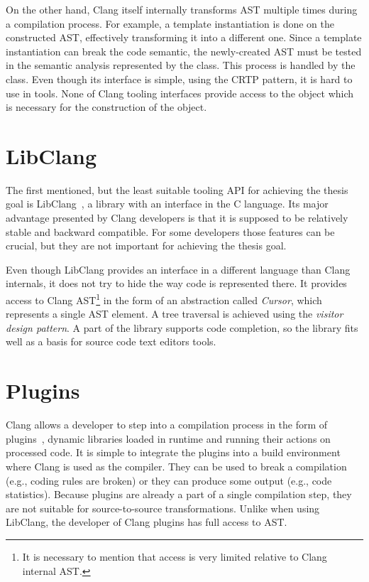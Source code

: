 On the other hand, Clang itself internally transforms AST multiple times during a compilation process. For example, a template instantiation is done on the constructed AST, effectively transforming it into a different one. Since a template instantiation can break the code semantic, the newly-created AST must be tested in the semantic analysis represented by the  class. This process is handled by the  class. Even though its interface is simple, using the CRTP pattern, it is hard to use  in tools. None of Clang tooling interfaces provide access to the  object which is necessary for the construction of the  object.

\section{LibClang}
The first mentioned, but the least suitable tooling API for achieving the thesis goal is LibClang~\cite{clang-libclang}, a library with an interface in the C language. Its major advantage presented by Clang developers is that it is supposed to be relatively stable and backward compatible. For some developers those features can be crucial, but they are not important for achieving the thesis goal.

Even though LibClang provides an interface in a different language than Clang internals, it does not try to hide the way code is represented there. It provides access to Clang AST\footnote{It is necessary to mention that access is very limited relative to Clang internal AST.} in the form of an abstraction called \emph{Cursor}, which represents a single AST element. A tree traversal is achieved using the \emph{visitor design pattern}. A part of the library supports code completion, so the library fits well as a basis for source code text editors tools.

\section{Plugins}
Clang allows a developer to step into a compilation process in the form of plugins~\cite{clang-plugins}, dynamic libraries loaded in runtime and running their actions on processed code. It is simple to integrate the plugins into a build environment where Clang is used as the compiler. They can be used to break a compilation (e.g., coding rules are broken) or they can produce some output (e.g., code statistics). Because plugins are already a part of a single compilation step, they are not suitable for source-to-source transformations. Unlike when using LibClang, the developer of Clang plugins has full access to AST.

